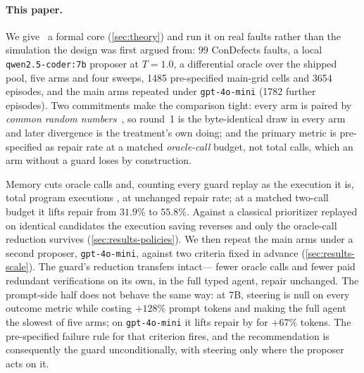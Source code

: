 \paragraph{This paper.}
We give \CEGMem\ a formal core (\cref{sec:theory}) and run it on real faults
rather than the simulation the design was first argued from: $99$ ConDefects
faults, a local \texttt{qwen2.5-coder:7b} proposer at $T = 1.0$, a differential
oracle over the shipped pool, five arms and four sweeps, \num{1485}
pre-specified main-grid cells and \num{3654} episodes, and the main arms
repeated under \texttt{gpt-4o-mini} (\num{1782} further episodes). Two
commitments make the
comparison tight: every arm is paired by \emph{common random
numbers}~\cite{law2000simulation}, so round~1 is the byte-identical draw in
every arm and later divergence is the treatment's own doing; and the primary
metric is pre-specified as repair rate at a matched \emph{oracle-call} budget,
not total calls, which an arm without a guard loses by construction.

Memory cuts oracle calls  and, counting every guard replay as the
execution it is, total program executions , at unchanged repair rate;
at a matched two-call budget it lifts repair from $31.9\%$ to $55.8\%$. Against
a classical prioritizer replayed on identical candidates the execution saving
reverses and only the oracle-call reduction survives
(\cref{sec:results-policies}). We then repeat the main arms under a second
proposer, \texttt{gpt-4o-mini}, against two criteria fixed in advance
(\cref{sec:results-scale}). The guard's reduction transfers intact---
fewer oracle calls and  fewer paid redundant verifications on its own,
 in the full typed agent, repair unchanged. The prompt-side half does
not behave the same way: at 7B, steering
is null on every outcome metric while costing $+128\%$ prompt tokens and making
the full agent the slowest of five arms; on \texttt{gpt-4o-mini} it lifts
repair by  for $+67\%$ tokens. The pre-specified failure rule for that
criterion fires, and the recommendation is consequently the guard
unconditionally, with steering only where the proposer acts on it.

